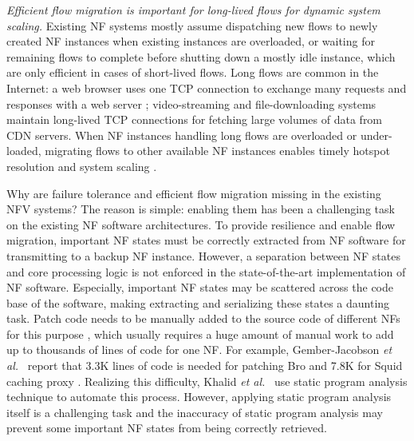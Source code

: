 {\em Efficient flow migration is important for long-lived flows for dynamic system scaling.} Existing NF systems \cite{palkar2015e2, gember2012stratos} mostly assume dispatching new flows to newly created NF instances when existing instances are overloaded, or waiting for remaining flows to complete before shutting down a mostly idle instance, %
which are only efficient in cases of short-lived flows. Long flows are common in the Internet: %
a web browser uses one TCP connection to exchange many requests and responses with a
web server \cite{http-keep-alive}; video-streaming
\cite{ffmpeg} and file-downloading \cite{ftp} systems maintain long-lived TCP
connections for fetching large volumes of data from CDN servers. %
 When NF instances handling long flows are overloaded or under-loaded, migrating flows to other available NF instances enables timely hotspot resolution and system scaling \cite{gember2015opennf}. %


Why are failure tolerance and efficient flow migration missing in the existing NFV systems? The reason is simple: enabling them %
 has been a challenging task on the existing NF software architectures. To provide resilience and enable flow migration, important NF states must be correctly extracted from NF software for transmitting to a backup NF instance. %
 However, a separation between NF states and core processing logic is not enforced in the state-of-the-art implementation of NF software. Especially, important NF states may be scattered across the code base of the software, making
extracting and serializing these states a daunting task. Patch code needs to be
manually added to the source code of different NFs for this purpose %
 \cite{gember2015opennf}\cite{rajagopalan2013split}, which usually requires a huge amount of manual work to add up to
thousands of lines of code for one NF. For example, Gember-Jacobson {\em et al.}~\cite{gember2015opennf} report
that 3.3K lines of code is needed for patching Bro \cite{bro} and 7.8K for Squid caching
proxy \cite{squid}.  Realizing this difficulty, Khalid {\em et al.}~\cite{khalid2016paving} use
static program analysis technique to automate this process. However, applying
static program analysis itself is a challenging task and the inaccuracy of
static program analysis may prevent some important NF states from being
correctly retrieved.

